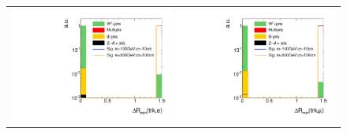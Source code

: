 \begin{figure}[!b]
  \centering 
  \begin{tabular}{c}
    \includegraphics[width=0.49\textwidth]{figures/analysis_2/AnalysisSelection/htrackdRminElec_log.pdf}
    \includegraphics[width=0.49\textwidth]{figures/analysis_2/AnalysisSelection/htrackdRminMuon_log.pdf}\\


\end{tabular}
\end{figure}
